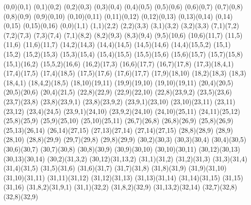 \begin{sseqpage}[ classes = fill, class labels = {right = 0.02em }, xscale = 0.65, yscale=0.65, axes gap = 0.6cm ]
\structline(0,0)(0,1)
\structline(0,1)(0,2)
\structline(0,2)(0,3)
\structline(0,3)(0,4)
\structline(0,4)(0,5)
\structline(0,5)(0,6)
\structline(0,6)(0,7)
\structline(0,7)(0,8)
\structline(0,8)(0,9)
\structline(0,9)(0,10)
\structline(0,10)(0,11)
\structline(0,11)(0,12)
\structline(0,12)(0,13)
\structline(0,13)(0,14)
\structline(0,14)(0,15)
\structline(0,15)(0,16)
\structline(0,0)(1,1)
\structline(1,1)(2,2)
\structline(2,2)(3,3)
\structline(3,1)(3,2)
\structline(3,2)(3,3)
\structline(7,1)(7,2)
\structline(7,2)(7,3)
\structline(7,3)(7,4)
\structline(7,1)(8,2)
\structline(8,2)(9,3)
\structline(8,3)(9,4)
\structline(9,5)(10,6)
\structline(10,6)(11,7)
\structline(11,5)(11,6)
\structline(11,6)(11,7)
\structline(14,2)(14,3)
\structline(14,4)(14,5)
\structline(14,5)(14,6)
\structline(14,4)(15,5,2)
\structline(15,1)(15,2)
\structline(15,2)(15,3)
\structline(15,3)(15,4)
\structline(15,4)(15,5)
\structline(15,5)(15,6)
\structline(15,6)(15,7)
\structline(15,7)(15,8)
\structline(15,1)(16,2)
\structline(15,5,2)(16,6)
\structline(16,2)(17,3)
\structline(16,6)(17,7)
\structline(16,7)(17,8)
\structline(17,3)(18,4,1)
\structline(17,4)(17,5)
\structline(17,4)(18,5)
\structline(17,5)(17,6)
\structline(17,6)(17,7)
\structline(17,9)(18,10)
\structline(18,2)(18,3)
\structline(18,3)(18,4,1)
\structline(18,4,2)(18,5)
\structline(18,10)(19,11)
\structline(19,9)(19,10)
\structline(19,10)(19,11)
\structline(20,4)(20,5)
\structline(20,5)(20,6)
\structline(20,4)(21,5)
\structline(22,8)(22,9)
\structline(22,9)(22,10)
\structline(22,8)(23,9,2)
\structline(23,5)(23,6)
\structline(23,7)(23,8)
\structline(23,8)(23,9,1)
\structline(23,8)(23,9,2)
\structline(23,9,1)(23,10)
\structline(23,10)(23,11)
\structline(23,11)(23,12)
\structline(23,4)(24,5)
\structline(23,9,1)(24,10)
\structline(23,9,2)(24,10)
\structline(24,10)(25,11)
\structline(24,11)(25,12)
\structline(25,8)(25,9)
\structline(25,9)(25,10)
\structline(25,10)(25,11)
\structline(26,7)(26,8)
\structline(26,8)(26,9)
\structline(25,8)(26,9)
\structline(25,13)(26,14)
\structline(26,14)(27,15)
\structline(27,13)(27,14)
\structline(27,14)(27,15)
\structline(28,8)(28,9)
\structline(28,9)(28,10)
\structline(28,8)(29,9)
\structline(29,7)(29,8)
\structline(29,8)(29,9)
\structline(30,2)(30,3)
\structline(30,3)(30,4)
\structline(30,4)(30,5)
\structline(30,6)(30,7)
\structline(30,7)(30,8)
\structline(30,8)(30,9)
\structline(30,9)(30,10)
\structline(30,10)(30,11)
\structline(30,12)(30,13)
\structline(30,13)(30,14)
\structline(30,2)(31,3,2)
\structline(30,12)(31,13,2)
\structline(31,1)(31,2)
\structline(31,2)(31,3)
\structline(31,3)(31,4)
\structline(31,4)(31,5)
\structline(31,5)(31,6)
\structline(31,6)(31,7)
\structline(31,7)(31,8)
\structline(31,8)(31,9)
\structline(31,9)(31,10)
\structline(31,10)(31,11)
\structline(31,11)(31,12)
\structline(31,12)(31,13)
\structline(31,13)(31,14)
\structline(31,14)(31,15)
\structline(31,15)(31,16)
\structline(31,8,2)(31,9,1)
\structline(31,1)(32,2)
\structline(31,8,2)(32,9)
\structline(31,13,2)(32,14)
\structline(32,7)(32,8)
\structline(32,8)(32,9)


\end{sseqpage}
